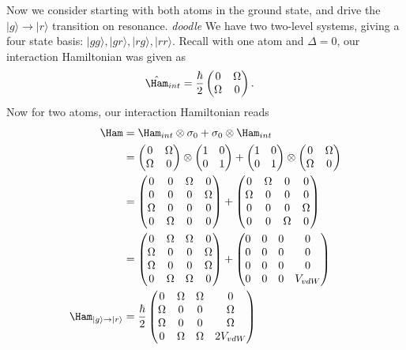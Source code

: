 \documentclass[a4paper, 11pt, normalem]{report}
\begin{document}
Now we consider starting with both atoms in the ground state, and drive the $|g\rangle\to|r\rangle$ transition on resonance.
\emph{doodle}
We have two two-level systems, giving a four state basis: $|gg\rangle,|gr\rangle,|rg\rangle,|rr\rangle$.
Recall with one atom and $\Delta=0$, our interaction Hamiltonian was given as
\begin{align}
    \hat{\Ham}_{int} &= \frac{\hbar}{2}\begin{pmatrix} 0 & \Omega \\ \Omega & 0\end{pmatrix}.
\end{align}
Now for two atoms, our interaction Hamiltonian reads
\begin{align}
    \Ham &= \Ham_{int}\otimes\sigma_0 + \sigma_0\otimes\Ham_{int} \\
         &= \begin{pmatrix}0 & \Omega \\ \Omega & 0\end{pmatrix}\otimes\begin{pmatrix}1&0\\0&1\end{pmatrix} + \begin{pmatrix}1&0\\0&1\end{pmatrix} \otimes\begin{pmatrix}0&\Omega\\\Omega&0\end{pmatrix} \\
         &= \begin{pmatrix} 0&0&\Omega&0\\0&0&0&\Omega\\\Omega&0&0&0\\0&\Omega&0&0\end{pmatrix} + \begin{pmatrix} 0&\Omega&0&0\\\Omega&0&0&0\\0&0&0&\Omega\\0&0&\Omega&0\end{pmatrix} \\
         &= \begin{pmatrix} 0&\Omega&\Omega&0\\\Omega&0&0&\Omega\\\Omega&0&0&\Omega\\0&\Omega&\Omega&0\end{pmatrix} + \begin{pmatrix}0&0&0&0\\0&0&0&0\\0&0&0&0\\0&0&0&V_{vdW}\end{pmatrix} \\
    \Ham_{|g\rangle\to|r\rangle} &= \frac{\hbar}{2}\begin{pmatrix} 0&\Omega&\Omega&0\\\Omega&0&0&\Omega\\\Omega&0&0&\Omega\\0&\Omega&\Omega&2V_{vdW}\end{pmatrix}
\end{align}
\end{document}
